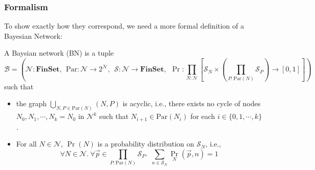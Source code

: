 \documentclass{article}
\begin{document}
	\subsubsection{Formalism}
	To show exactly how they correspond, we need a more formal definition of a Bayesian Network:
	\begin{defn}
			A Baysian network (BN) is a tuple
			\[
				\mathcal B = \left(\mathcal N : \mathbf{FinSet}, ~~\mathrm{Par}: \mathcal N \to 2^{\mathcal N},~~ \mathcal S: \mathcal N \to \mathbf{FinSet},~~\Pr: \prod_{N : \mathcal N}  \left[ \mathcal S_N \times \left(\prod_{P : \mathrm{Par}(N)} \mathcal S_P\right)  \to [0,1] \right] \right)
			\]
			such that
			\begin{itemize}[nosep]
				\item the graph $\bigcup_{N, P \in \mathrm{Par}(N)}(N, P)$ is acyclic, i.e., there exists no cycle of nodes $N_0, N_1, \cdots, N_k = N_0$ in $\mathcal N^k$ such that $N_{i+1} \in \mathrm{Par}(N_i)$ for each $i \in \{0, 1, \cdots, k\}$.
				\item For all $N \in \mathcal N$, $\Pr(N)$ is a probability distribution on $\mathcal S_N$, i.e., 
				\[ \forall N\in \mathcal N.~\forall \vec{p} \in {\prod_{P : \mathrm{Par}(N)} \mathcal S_P}.~~ \sum_{n \in \mathcal S_{N}} \Pr_N(\vec{p}, n) = 1\]
			\end{itemize}
		\end{defn}
	
\end{document}
